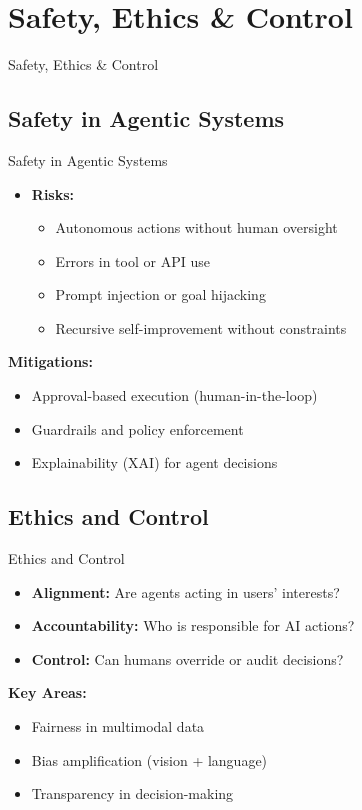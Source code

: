 \section{Safety, Ethics & Control}
\begin{frame}{}
    \LARGE Safety, Ethics & Control
\end{frame}


\subsection{Safety in Agentic Systems}
\begin{frame}[allowframebreaks]{Safety in Agentic Systems}
    \begin{itemize}
        \item \textbf{Risks:}
        \begin{itemize}
            \item Autonomous actions without human oversight
            \item Errors in tool or API use
            \item Prompt injection or goal hijacking
            \item Recursive self-improvement without constraints
        \end{itemize}
    \end{itemize}
    \vspace{1em}
    \textbf{\faEye\hspace{0.5em}Mitigations:}
    \begin{itemize}
        \item Approval-based execution (human-in-the-loop)
        \item Guardrails and policy enforcement
        \item Explainability (XAI) for agent decisions
    \end{itemize}
\end{frame}


\subsection{Ethics and Control}
\begin{frame}[allowframebreaks]{Ethics and Control}
    \begin{itemize}
        \item \textbf{Alignment:} Are agents acting in users’ interests?
        \item \textbf{Accountability:} Who is responsible for AI actions?
        \item \textbf{Control:} Can humans override or audit decisions?
    \end{itemize}
    \vspace{1em}
    \textbf{\faLightbulbO\hspace{0.5em}Key Areas:}
    \begin{itemize}
        \item Fairness in multimodal data
        \item Bias amplification (vision + language)
        \item Transparency in decision-making
    \end{itemize}
\end{frame}


